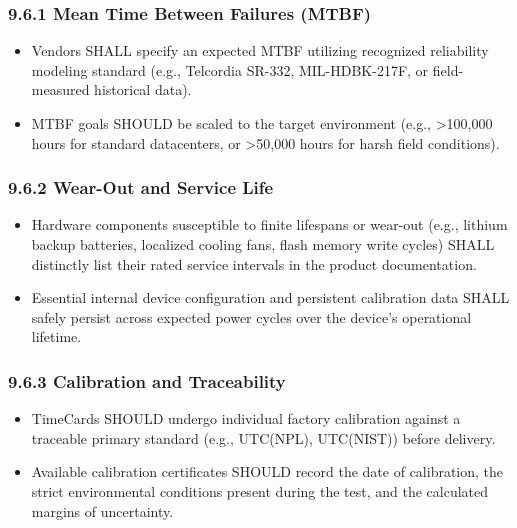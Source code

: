 \subsubsection{9.6.1 Mean Time Between Failures
(MTBF)}\label{mean-time-between-failures-mtbf}

\begin{itemize}
\tightlist
\item
  Vendors SHALL specify an expected MTBF utilizing recognized
  reliability modeling standard (e.g., Telcordia SR-332, MIL-HDBK-217F,
  or field-measured historical data).\\
\item
  MTBF goals SHOULD be scaled to the target environment (e.g.,
  \textgreater100,000 hours for standard datacenters, or
  \textgreater50,000 hours for harsh field conditions).
\end{itemize}

\subsubsection{9.6.2 Wear-Out and Service
Life}\label{wear-out-and-service-life}

\begin{itemize}
\tightlist
\item
  Hardware components susceptible to finite lifespans or wear-out (e.g.,
  lithium backup batteries, localized cooling fans, flash memory write
  cycles) SHALL distinctly list their rated service intervals in the
  product documentation.\\
\item
  Essential internal device configuration and persistent calibration
  data SHALL safely persist across expected power cycles over the
  device's operational lifetime.
\end{itemize}

\subsubsection{9.6.3 Calibration and
Traceability}\label{calibration-and-traceability}

\begin{itemize}
\tightlist
\item
  TimeCards SHOULD undergo individual factory calibration against a
  traceable primary standard (e.g., UTC(NPL), UTC(NIST)) before
  delivery.\\
\item
  Available calibration certificates SHOULD record the date of
  calibration, the strict environmental conditions present during the
  test, and the calculated margins of uncertainty.
\end{itemize}

